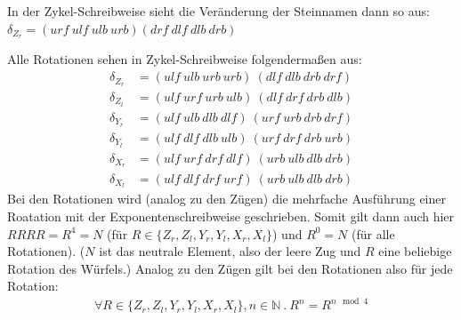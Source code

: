 \documentclass[12pt,a4paper, usenames, dvipsnames]{article}
\newcommand{\Gtwo}{\ensuremath{G_{2\times 2\times 2}}}
\begin{document}
In der Zykel-Schreibweise sieht die Veränderung der Steinnamen dann so aus: \\
$\delta_{Z_r}=(urf \ ulf \ ulb \ urb)(drf \ dlf \ dlb \ drb )$ 

Alle Rotationen sehen in Zykel-Schreibweise folgendermaßen aus:
\begin{align*}
\delta_{Z_r} & = (ulf \ ulb \ urb \ urb) \ (dlf \ dlb \ drb \ drf)\\
\delta_{Z_l} & = (ulf \ urf \ urb \ ulb) \ (dlf \ drf \ drb \ dlb)\\
\delta_{Y_r} & = (ulf \ ulb \ dlb \ dlf) \ (urf \ urb \ drb \ drf)\\
\delta_{Y_l} & = (ulf \ dlf \ dlb \ ulb) \ (urf \ drf \ drb \ urb)\\
\delta_{X_r} & = (ulf \ urf \ drf \ dlf) \ (urb \ ulb \ dlb \ drb)\\
\delta_{X_l} & = (ulf \ dlf \ drf \ urf) \ (urb \ ulb \ dlb \ drb)
\end{align*}
Bei den Rotationen wird (analog zu den Zügen) die mehrfache Ausführung einer Roatation mit der Exponentenschreibweise geschrieben. 
Somit gilt dann auch hier $RRRR=R^4=N$ (für $R \in \{{Z_r}, {Z_l}, {Y_r}, {Y_l}, {X_r}, {X_l} \}$) und $R^0=N$ (für alle Rotationen). ($N$ ist das neutrale Element, also der leere Zug und $R$ eine beliebige Rotation des Würfels.) 
Analog zu den Zügen gilt bei den Rotationen also für jede Rotation: 
\begin{align*}
\forall R \in \{{Z_r}, {Z_l}, {Y_r}, {Y_l}, {X_r}, {X_l} \}, n \in \mathbb{N} \ . \ R^n=R^{n \mod 4}
\end{align*}

%
%
%
%
%
%
%
%
%
%
%
%
%
%
%
%
%
%
%
%





\end{document}
